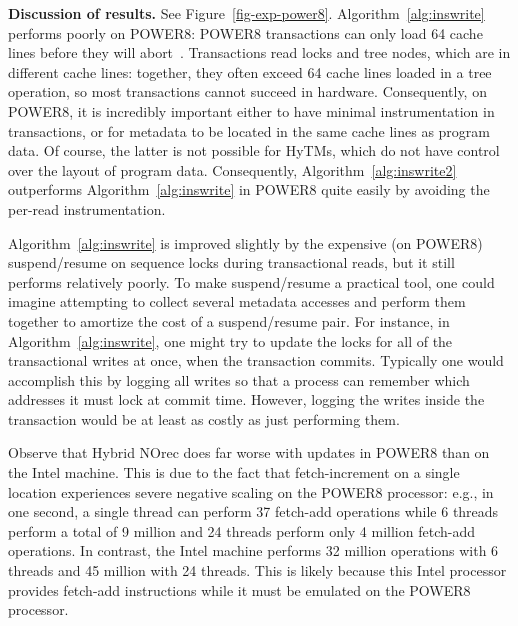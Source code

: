 \vspace{1mm}\noindent\textbf{Discussion of results.}
See Figure~\ref{fig-exp-power8}.
%
Algorithm~\ref{alg:inswrite} performs poorly on POWER8: POWER8 transactions can only load 64 cache lines before they will abort~\cite{nguyen-thesis}. 
Transactions read locks and tree nodes, which are in different cache lines: together, they often exceed 64 cache lines loaded in a tree operation, 
so most transactions cannot succeed in hardware. Consequently, on POWER8, 
it is incredibly important either to have minimal instrumentation in transactions, or for metadata to be located in the 
same cache lines as program data. Of course, the latter is not possible for HyTMs, which do not have control over the layout of program data.
Consequently, Algorithm~\ref{alg:inswrite2} outperforms Algorithm~\ref{alg:inswrite} in POWER8 quite easily by avoiding the per-read instrumentation. 

Algorithm~\ref{alg:inswrite} is improved slightly by the expensive (on POWER8) suspend/resume on sequence locks during transactional reads, but it still performs relatively poorly. 
To make suspend/resume a practical tool, one could imagine attempting to 
collect several metadata accesses and perform them together to amortize the cost of a suspend/resume pair. For instance, 
in Algorithm~\ref{alg:inswrite}, one might try to update the locks for all of the transactional writes at once, when the transaction commits. 
Typically one would accomplish this by logging all writes so that a process can remember which addresses it must lock at commit time. 
However, logging the writes inside the transaction would be at least as costly as just performing them.

Observe that Hybrid NOrec does far worse with updates in POWER8 than on the Intel machine.
This is due to the fact that fetch-increment on a single location experiences severe negative scaling on the POWER8 processor: e.g., in one second, a single
thread can perform 37 fetch-add operations while 6 threads perform a total of 9 million and 24 threads perform only 4 million fetch-add operations.
In contrast, the Intel machine performs 32 million operations with 6 threads and 45 million with 24 threads. This is likely because this Intel processor provides 
fetch-add instructions while it must be emulated on the POWER8 processor.

